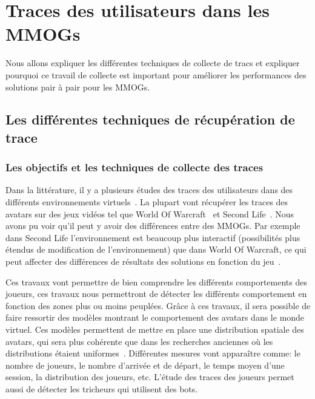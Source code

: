 \newpage
\section{Traces des utilisateurs dans les MMOGs}
	\label{trace}
	Nous allons expliquer les différentes techniques de collecte de tracs et expliquer pourquoi ce travail de collecte est important pour améliorer les performances des solutions pair à pair pour les MMOGs.
	\subsection{Les différentes techniques de récupération de trace}
		\subsubsection{Les objectifs et les techniques de collecte des traces}
		\par Dans la littérature, il y a plusieurs études des traces des utilisateurs dans des différents environnements virtuels~\cite{1326262,0295-5075-88-4-48007}. La plupart vont récupérer les traces des avatars sur des jeux vidéos tel que World Of Warcraft~\cite{wow} et Second Life~\cite{sl}. Nous avons pu voir qu'il peut y avoir des différences entre des MMOGs. Par exemple dans Second Life l'environnement est beaucoup plus interactif (possibilités plus étendus de modification de l'environnement) que dans World Of Warcraft, ce qui peut affecter des différences de résultats des solutions en fonction du jeu~\cite{DBLP:journals/corr/abs-0807-2328,1613041}. \\
\par Ces travaux vont permettre de bien comprendre les différents comportements des joueurs, ces travaux nous permettront de détecter les différents comportement en fonction des zones plus ou moins peuplées. Grâce à ces travaux, il sera possible de faire ressortir des modèles montrant le comportement des avatars dans le monde virtuel. Ces modèles permettent de mettre en place une distribution spatiale des avatars, qui sera plus cohérente que dans les recherches anciennes où les distributions étaient uniformes~\cite{Knutsson04peer-to-peersupport}. Différentes mesures vont apparaître comme: le nombre de joueurs, le nombre d'arrivée et de départ, le temps moyen d'une session, la distribution des joueurs, etc. L'étude des traces des joueurs permet aussi de détecter les tricheurs qui utilisent des bots. \\
